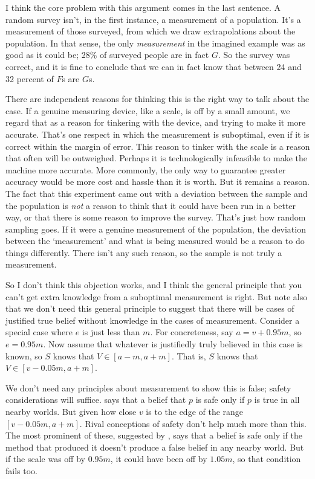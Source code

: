 {I think the core problem with this argument comes in the last sentence. A random survey isn't, in the first instance, a measurement of a population. It's a measurement of those surveyed, from which we draw extrapolations about the population. In that sense, the only \textit{measurement} in the imagined example was as good as it could be; 28\% of surveyed people are in fact $G$. So the survey was correct, and it is fine to conclude that we can in fact know that between 24 and 32 percent of $F$s are $G$s.

There are independent reasons for thinking this is the right way to talk about the case. If a genuine measuring device, like a scale, is off by a small amount, we regard that as a reason for tinkering with the device, and trying to make it more accurate. That's one respect in which the measurement is suboptimal, even if it is correct within the margin of error. This reason to tinker with the scale is a reason that often will be outweighed. Perhaps it is technologically infeasible to make the machine more accurate. More commonly, the only way to guarantee greater accuracy would be more cost and hassle than it is worth. But it remains a reason. The fact that this experiment came out with a deviation between the sample and the population is \textit{not} a reason to think that it could have been run in a better way, or that there is some reason to improve the survey. That's just how random sampling goes. If it were a genuine measurement of the population, the deviation between the `measurement' and what is being measured would be a reason to do things differently. There isn't any such reason, so the sample is not truly a measurement.

So I don't think this objection works, and I think the general principle that you can't get extra knowledge from a suboptimal measurement is right. But note also that we don't need this general principle to suggest that there will be cases of justified true belief without knowledge in the cases of measurement. Consider a special case where $e$ is just less than $m$. For concreteness, say $a = v + 0.95m$, so $e = 0.95m$. Now assume that whatever is justifiedly truly believed in this case is known, so $S$ knows that $V \in [a - m, a + m]$. That is, $S$ knows that $V \in [v - 0.05m, a + m]$.

We don't need any principles about measurement to show this is false; safety considerations will suffice. \citet{Williamson2000-WILKAI} says that a belief that $p$ is safe only if $p$ is true in all nearby worlds. But given how close $v$ is to the edge of the range $[v - 0.05m, a + m]$. Rival conceptions of safety don't help much more than this. The most prominent of these, suggested by \citet{Sainsbury1996}, says that a belief is safe only if the method that produced it doesn't produce a false belief in any nearby world. But if the scale was off by $0.95m$, it could have been off by $1.05m$, so that condition fails too.

}
